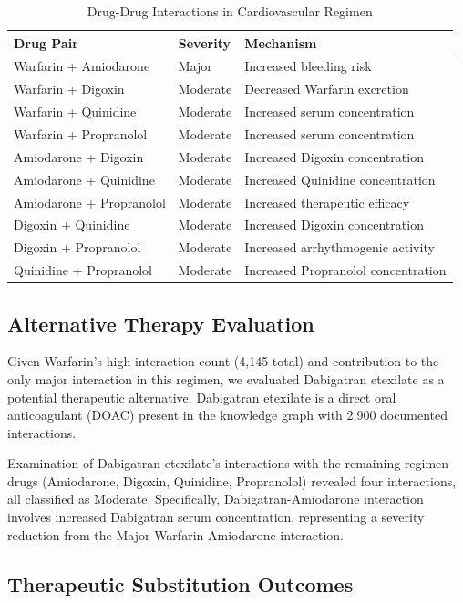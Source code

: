 \documentclass[11pt,a4paper]{article}
\begin{document}
\begin{table}[H]
\centering
\caption{Drug-Drug Interactions in Cardiovascular Regimen}
\label{tab:case_ddis}
\begin{tabular}{lll}
\toprule
\textbf{Drug Pair} & \textbf{Severity} & \textbf{Mechanism} \\
\midrule
Warfarin + Amiodarone & Major & Increased bleeding risk \\
Warfarin + Digoxin & Moderate & Decreased Warfarin excretion \\
Warfarin + Quinidine & Moderate & Increased serum concentration \\
Warfarin + Propranolol & Moderate & Increased serum concentration \\
Amiodarone + Digoxin & Moderate & Increased Digoxin concentration \\
Amiodarone + Quinidine & Moderate & Increased Quinidine concentration \\
Amiodarone + Propranolol & Moderate & Increased therapeutic efficacy \\
Digoxin + Quinidine & Moderate & Increased Digoxin concentration \\
Digoxin + Propranolol & Moderate & Increased arrhythmogenic activity \\
Quinidine + Propranolol & Moderate & Increased Propranolol concentration \\
\bottomrule
\end{tabular}
\end{table}

\subsection{Alternative Therapy Evaluation}

Given Warfarin's high interaction count (4,145 total) and contribution to the only major interaction in this regimen, we evaluated Dabigatran etexilate as a potential therapeutic alternative. Dabigatran etexilate is a direct oral anticoagulant (DOAC) present in the knowledge graph with 2,900 documented interactions.

Examination of Dabigatran etexilate's interactions with the remaining regimen drugs (Amiodarone, Digoxin, Quinidine, Propranolol) revealed four interactions, all classified as Moderate. Specifically, Dabigatran-Amiodarone interaction involves increased Dabigatran serum concentration, representing a severity reduction from the Major Warfarin-Amiodarone interaction.

\subsection{Therapeutic Substitution Outcomes}
\end{document}
